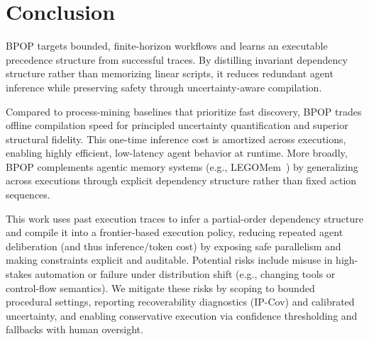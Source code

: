 \documentclass{article}
\theoremstyle{plain}
\theoremstyle{definition}
\theoremstyle{remark}
\begin{document}
\section{Conclusion}
\label{sec:conclusion}
BPOP targets bounded, finite-horizon workflows and learns an executable precedence structure from successful traces. By distilling invariant dependency structure rather than memorizing linear scripts, it reduces redundant agent inference while preserving safety through uncertainty-aware compilation.

Compared to process-mining baselines that prioritize fast discovery, BPOP trades offline compilation speed for principled uncertainty quantification and superior structural fidelity. This one-time inference cost is amortized across executions, enabling highly efficient, low-latency agent behavior at runtime. More broadly, BPOP complements agentic memory systems (e.g., LEGOMem~\citep{han2025legomemmodularproceduralmemory}) by generalizing across executions through explicit dependency structure rather than fixed action sequences.


This work uses past execution traces to infer a partial-order dependency structure and compile it into a frontier-based
execution policy, reducing repeated agent deliberation (and thus inference/token cost) by exposing safe parallelism and
making constraints explicit and auditable. Potential risks include misuse in high-stakes automation or failure under
distribution shift (e.g., changing tools or control-flow semantics). We mitigate these risks by scoping to bounded procedural settings, reporting recoverability diagnostics (IP-Cov) and calibrated uncertainty, and enabling conservative execution via confidence thresholding and fallbacks with human oversight.






\newpage
\appendix
\onecolumn

\end{document}
